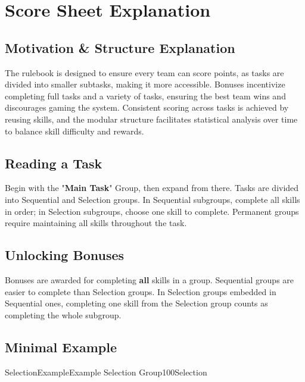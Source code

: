 \section*{Score Sheet Explanation}

\subsection*{Motivation \& Structure Explanation}

The rulebook is designed to ensure every team can score points, as tasks are divided into smaller subtasks, making it more accessible. Bonuses incentivize completing full tasks and a variety of tasks, ensuring the best team wins and discourages gaming the system. Consistent scoring across tasks is achieved by reusing skills, and the modular structure facilitates statistical analysis over time to balance skill difficulty and rewards.

\subsection*{Reading a Task}

Begin with the "\textbf{\textcolor{myturquoise}{Main Task}}" Group, then expand from there. Tasks are divided into Sequential and Selection groups. In Sequential subgroups, complete all skills in order; in Selection subgroups, choose one skill to complete. Permanent groups require maintaining all skills throughout the task.

\subsection*{Unlocking Bonuses}

Bonuses are awarded for completing \textbf{all} skills in a group. Sequential groups are easier to complete than Selection groups. In Selection groups embedded in Sequential ones, completing one skill from the Selection group counts as completing the whole subgroup.

\subsection*{Minimal Example}


\begin{Group}{SelectionExample}{Example Selection Group}{100}{Selection}
\end{Group}

